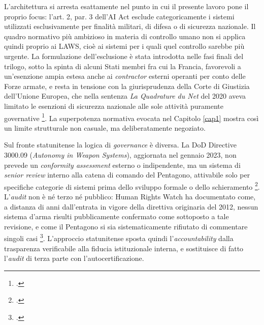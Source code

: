 \documentclass[a4paper,12pt]{report}
\begin{document}
L'architettura si arresta esattamente nel punto in cui il presente lavoro pone il
proprio focus: l'art. 2, par. 3 dell'AI Act esclude categoricamente i sistemi
utilizzati esclusivamente per finalità militari, di difesa o di sicurezza
nazionale. Il quadro normativo più ambizioso in materia di controllo umano non si
applica quindi proprio ai LAWS, cioè ai sistemi per i quali quel controllo
sarebbe più urgente. La formulazione dell'esclusione è stata introdotta nelle fasi
finali del trilogo, sotto la spinta di alcuni Stati membri fra cui la Francia,
favorevoli a un'esenzione ampia estesa anche ai \textit{contractor} esterni
operanti per conto delle Forze armate, e resta in tensione con la giurisprudenza
della Corte di Giustizia dell'Unione Europea, che nella sentenza \textit{La
Quadrature du Net} del 2020 aveva limitato le esenzioni di sicurezza nazionale
alle sole attività puramente governative
\footcite{vogiatzoglou_2024_ai_act_exception}. La superpotenza normativa evocata
nel Capitolo \ref{cap1} mostra così un limite strutturale non casuale, ma
deliberatamente negoziato.

Sul fronte statunitense la logica di \textit{governance} è diversa. La DoD
Directive 3000.09 (\textit{Autonomy in Weapon Systems}), aggiornata nel gennaio
2023, non prevede un \textit{conformity assessment} esterno o indipendente, ma un
sistema di \textit{senior review} interno alla catena di comando del Pentagono,
attivabile solo per specifiche categorie di sistemi prima dello sviluppo formale
o dello schieramento \footcite{dod_directive_3000_09}. L'\textit{audit} non è né
terzo né pubblico: Human Rights Watch ha documentato come, a distanza di anni
dall'entrata in vigore della direttiva originaria del 2012, nessun sistema d'arma
risulti pubblicamente confermato come sottoposto a tale revisione, e come il
Pentagono si sia sistematicamente rifiutato di commentare singoli casi
\footcite{hrw_2023_dod3009review}. L'approccio statunitense sposta quindi
l'\textit{accountability} dalla trasparenza verificabile alla fiducia
istituzionale interna, e sostituisce di fatto l'\textit{audit} di terza parte con
l'autocertificazione.
\end{document}
